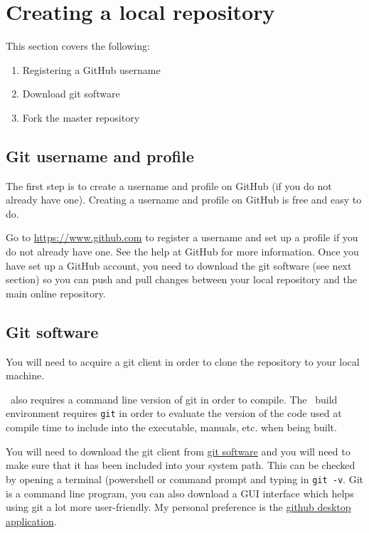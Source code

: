 \section{Creating a local repository\label{sec:local_repo}}

This section covers the following:

\begin{enumerate}
	\item Registering a GitHub username
	\item Download git software
	\item Fork the master repository
\end{enumerate}

\subsection{Git username and profile}

The first step is to create a username and profile on GitHub (if you do not already have one). Creating a username and profile on GitHub is free and easy to do. 

Go to \url{https://www.github.com} to register a username and set up a profile if you do not already have one. See the help at GitHub for more information. Once you have set up a GitHub account, you need to download the git software (see next section) so you can push and pull changes between your local repository and the main online repository.

\subsection{Git software}

You will need to acquire a git client in order to clone the repository to your local machine.

\CNAME\ also requires a command line version of git in order to compile. The \CNAME\ build environment requires \texttt{git} in order to evaluate the version of the code used at compile time to include into the executable, manuals, etc. when being built. 

You will need to download the git client from \href{https://git-scm.com/downloads}{git software} and you will need to make sure that it has been included into your system path. This can be checked by opening a terminal (powershell or command prompt and typing in \texttt{git -v}. Git is a command line program, you can also download a GUI interface which helps using git a lot more user-friendly. My personal preference is the \href{https://desktop.github.com/}{github desktop application}. 

